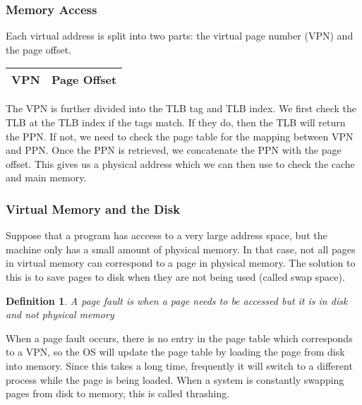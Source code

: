 \documentclass{article}
\newtheorem{definition}{Definition}
\begin{document}
\subsubsection{Memory Access}
Each virtual address is split into two parts: the virtual page number (VPN) and the page offset.
\begin{center}
    \begin{tabular}{|c|c|}
        \hline
        VPN & Page Offset\\
        \hline
    \end{tabular}
\end{center}
The VPN is further divided into the TLB tag and TLB index. We first check the TLB at the TLB index if
the tags match. If they do, then the TLB will return the PPN. If not, we need to check the page table for
the mapping between VPN and PPN. Once the PPN is retrieved, we concatenate the PPN with the page offset. This gives us
a physical address which we can then use to check the cache and main memory.
\begin{figure}[H]
\end{figure}
\subsubsection{Virtual Memory and the Disk}
Suppose that a program has acccess to a very large address space, but the machine only has a small amount of physical memory. In that case,
not all pages in virtual memory can correspond to a page in physical memory. The solution to this is to save pages to disk when they are not being used (called swap space).
\begin{definition}
    A page fault is when a page needs to be accessed but it is in disk and not physical memory
\end{definition}
When a page fault occurs, there is no entry in the page table which corresponds to a VPN, so the OS will update the page table
by loading the page from disk into memory. Since this takes a long time, frequently it will switch to a different process while the page is being loaded.
When a system is constantly swapping pages from disk to memory, this is called thrashing.
\end{document}
